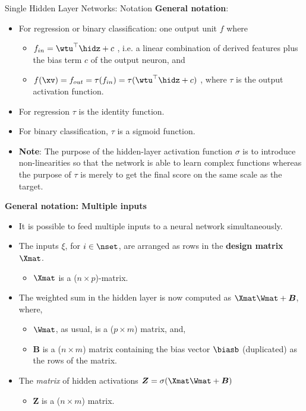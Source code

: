 \begin{vbframe}{Single Hidden Layer Networks: Notation}
\framebreak
  \textbf{General notation}:
  \begin{itemize}
    \vspace{4mm}
    \item For regression or binary classification: one output unit $f$ where
      \begin{itemize}
        \item $f_{in} = \wtu^\top \hidz + c$ , i.e. a linear combination of derived features plus the bias term $c$ of the output neuron, and
        \vspace{2mm}
        \item $f(\xv)= f_{out} = \tau(f_{in}) = \tau(\wtu^\top \hidz + c)$ , where $\tau$ is the output activation function.
      \end{itemize}
    \item For regression $\tau$ is the identity function.
    \item For binary classification, $\tau$ is a sigmoid function.
    \item \textbf{Note}: The purpose of the hidden-layer activation function $\sigma$ is to introduce non-linearities so that the network is able to learn complex functions whereas the purpose of $\tau$ is merely to get the final score on the same scale as the target.
  \end{itemize}

\framebreak 

  \textbf{General notation: Multiple inputs}
  \begin{itemize}
    \item It is possible to feed multiple inputs to a neural network simultaneously.
    \vspace{2mm}
    \item The inputs $\xi$, for $i \in \nset$, are arranged as rows in the \textbf{design matrix} $\Xmat$.
    \begin{itemize}
      \item $\Xmat$ is a ($n \times p$)-matrix.
    \end{itemize}
    \vspace{2mm}
    \item The weighted sum in the hidden layer is now computed as $\Xmat\Wmat + \bm{B}$, where,
      \begin{itemize}
        \item $\Wmat$, as usual, is a ($p \times m$) matrix, and,
        \vspace{2mm}
        \item $\bm{B}$ is a ($n \times m$) matrix containing the bias vector $\biasb$ (duplicated) as the rows of the matrix.
      \end{itemize}
    \vspace{2mm}
    \item The \textit{matrix} of hidden activations $\bm{Z} = \sigma(\Xmat\Wmat + \bm{B})$
    \begin{itemize}
      \item $\bm{Z}$ is a ($n \times m$) matrix.
    \end{itemize}
  \end{itemize}


\end{vbframe}
